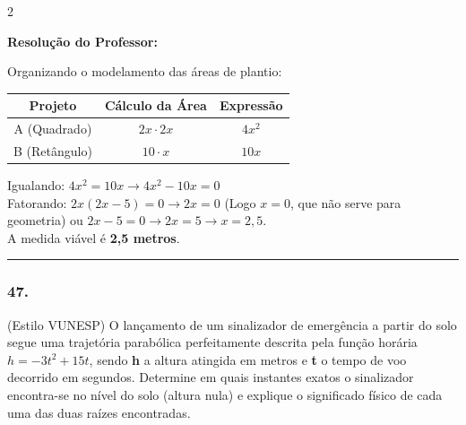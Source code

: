\begin{multicols*}{2}
\ifgabarito
    \begin{tcolorbox}[colback=CorTitUm!5, colframe=CorTitUm, boxrule=1pt, arc=4pt, left=6pt, right=6pt, top=6pt, bottom=6pt]
    \small\textbf{\textcolor{CorTitUm}{Resolução do Professor:}}\par\vspace{0.1cm}
    \color{CinzaEscuro}
    Organizando o modelamento das áreas de plantio:
    \vspace{0.1cm}
    \begin{center}
    \begin{tabular}{|c|c|c|}
    \hline
    \textbf{Projeto} & \textbf{Cálculo da Área} & \textbf{Expressão} \\
    \hline
    A (Quadrado) & $2x \cdot 2x$ & $4x^2$ \\
    \hline
    B (Retângulo) & $10 \cdot x$ & $10x$ \\
    \hline
    \end{tabular}
    \end{center}
    \vspace{0.1cm}
    Igualando: $4x^2 = 10x \rightarrow 4x^2 - 10x = 0$\\
    Fatorando: $2x(2x - 5) = 0 \rightarrow 2x = 0$ (Logo $x = 0$, que não serve para geometria) ou $2x - 5 = 0 \rightarrow 2x = 5 \rightarrow x = 2,5$.\\
    A medida viável é \textbf{2,5 metros}.
    \end{tcolorbox}
\fi

\par\vspace{\espacoQuestao}

\noindent\textcolor{CorLinha}{\rule{\linewidth}{0.5pt}} 
\par\vspace{\espacoPreQuestao}
\subsubsection*{47.} (Estilo VUNESP) O lançamento de um sinalizador de emergência a partir do solo segue uma trajetória parabólica perfeitamente descrita pela função horária $ h = -3t^2 + 15t $, sendo \textbf{h} a altura atingida em metros e \textbf{t} o tempo de voo decorrido em segundos. Determine em quais instantes exatos o sinalizador encontra-se no nível do solo (altura nula) e explique o significado físico de cada uma das duas raízes encontradas.


\end{multicols*}
